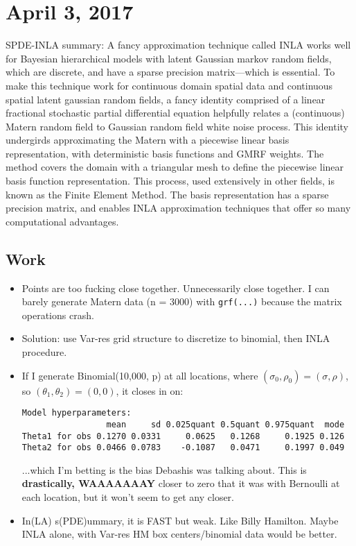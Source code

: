 \documentclass{article}
\begin{document}
\section*{April 3, 2017}
SPDE-INLA summary: A fancy approximation technique called INLA works well for Bayesian hierarchical models with latent Gaussian markov random fields, which are discrete, and have a sparse precision matrix---which is essential. To make this technique work for continuous domain spatial data and continuous spatial latent gaussian random fields, a fancy identity comprised of a linear fractional stochastic partial differential equation helpfully relates a (continuous) Matern random field to Gaussian random field white noise process. This identity undergirds approximating the Matern with a piecewise linear basis representation, with deterministic basis functions and GMRF weights. The method covers the domain with a triangular mesh to define the piecewise linear basis function representation. This process, used extensively in other fields, is known as the Finite Element Method. The basis representation has a sparse precision matrix, and enables INLA approximation techniques that offer so many computational advantages. 

\subsection*{Work}
\begin{itemize}
\item Points are too fucking close together. Unnecessarily close together. I can barely generate Matern data (n = 3000) with \verb|grf(...)| because the matrix operations crash.
\item Solution: use Var-res grid structure to discretize to binomial, then INLA procedure.
\item If I generate Binomial(10,000, p) at all locations, where $(\sigma_{0}, \rho_{0}) = (\sigma, \rho)$, so $(\theta_{1}, \theta_{2}) = (0,0)$, it closes in on:
\begin{verbatim}
Model hyperparameters:
                 mean     sd 0.025quant 0.5quant 0.975quant  mode
Theta1 for obs 0.1270 0.0331     0.0625   0.1268     0.1925 0.126
Theta2 for obs 0.0466 0.0783    -0.1087   0.0471     0.1997 0.049
\end{verbatim}
...which I'm betting is the bias Debashis was talking about. This is {\bf drastically, WAAAAAAAY} closer to zero that it was with Bernoulli at each location, but it won't seem to get any closer. 
\item In(LA) s(PDE)ummary, it is FAST but weak. Like Billy Hamilton. Maybe INLA alone, with Var-res HM box centers/binomial data would be better.
\end{itemize}
\end{document}

